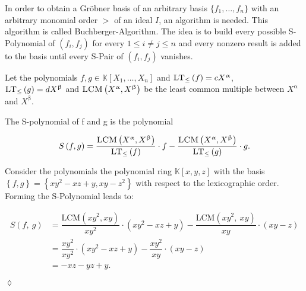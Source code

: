 In order to obtain a Gröbner basis of an arbitrary basis $\{f_{1}, \ldots , f_{n}\}$ with an arbitrary monomial order $>$ of an ideal $I$, an algorithm is needed. This algorithm is called Buchberger-Algorithm. The idea is to build every possible S-Polynomial of $\left( f_{i},f_{j}\right) $ for every $ 1 \leq i \neq j \leq n $ and every nonzero result is added to the basis until every S-Pair of $\left( f_{i},f_{j}\right) $ vanishes.

Let the polynomials $f,g \in \mathbb{K}\left[X_{1}, \dots, X_{n}\right] $ and $\textsc{LT}_{\leq}\left(f \right) = cX^{\upalpha} $, \\  $\textsc{LT}_{\leq}\left(g \right) = dX^{\upbeta} $ and $\textsc{LCM}\left( X^{\upalpha},X^{\upbeta}\right) $ be the least common multiple between $X^{\upalpha}$ and $X^{\upbeta}$. 

\begin{env_definition}[S-Polynomial]
\cite{KHZ} The S-polynomial of f and g is the polynomial

\[ S\left( f,g\right) = \frac{\textsc{LCM}\left( X^{\upalpha}, X^{\upbeta}\right) }{\textsc{LT}_{\leq}\left( f\right) } \cdot f - \frac{ \textsc{LCM}\left( X^{\upalpha}, X^{\upbeta}\right) }{\textsc{LT}_{\leq}\left( g\right) } 
\cdot g. \]


\end{env_definition}

\newpage

\begin{env_example}\normalfont
Consider the polynomials the polynomial ring $\mathbb{K}\left[ x,y,z\right] $ with
the basis $\left\lbrace f,g\right\rbrace = \left\lbrace xy^{2}-xz+y,xy-z^{2} \right\rbrace $ with respect to the lexicographic order.\\
Forming the S-Polynomial leads to:

\begin{align*}
 S \left(f,~g\right) &= \dfrac{\textrm{LCM}\left( xy^{2}, xy \right) } {xy^{2} } \cdot \left(  xy^{2}-xz+y\right) - \dfrac{\textrm{LCM}\left( xy^{2},~xy \right) } {xy } \cdot \left( xy-z \right) \\ 
 &= \dfrac{xy^{2}}{xy^{2}} \cdot \left( xy^{2}-xz+y\right) - \dfrac{xy^{2}}{xy} \cdot \left( xy-z\right) \\
 &= -xz-yz+y. 
\end{align*}


\begin{flushright}
$\lozenge$
\end{flushright} 
\end{env_example}

